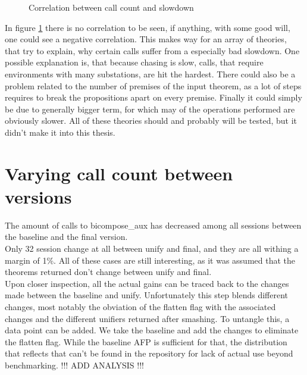 \begin{figure}[ht]
\centering
\caption{Correlation between call count and slowdown}
\label{fig:correlation}
\end{figure}

In figure \ref{fig:correlation} there is no correlation to be seen, if anything, with some good will, one could see a negative correlation. This makes way for an array of theories, that try to explain, why certain calls suffer from a especially bad slowdown. One possible explanation is, that because chasing is slow, calls, that require environments with many substations, are hit the hardest. There could also be a problem related to the number of premises of the input theorem, as a lot of steps requires to break the propositions apart on every premise. Finally it could simply be due to generally bigger term, for which may of the operations performed are obviously slower. All of these theories should and probably will be tested, but it didn't make it into this thesis.

\section{Varying call count between versions}

The amount of calls to bicompose\_aux has decreased among all sessions between the baseline and the final version.\\
Only 32 session change at all between unify and final, and they are all withing a margin of 1\%. All of these cases are still interesting, as it was assumed that the theorems returned don't change between unify and final.\\
Upon closer inspection, all the actual gains can be traced back to the changes made between the baseline and unify. Unfortunately this step blends different changes, most notably the obviation of the flatten flag with the associated changes and the different unifiers returned after smashing. To untangle this, a data point can be added. We take the baseline and add the changes to eliminate the flatten flag. While the baseline AFP is sufficient for that, the distribution that reflects that can't be found in the repository for lack of actual use beyond benchmarking.
    !!! ADD ANALYSIS !!!